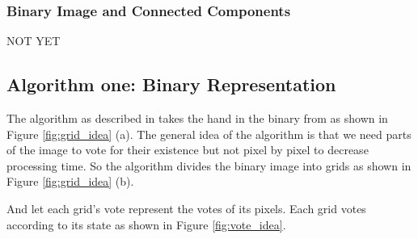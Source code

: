\subsubsection{Binary Image and Connected Components}
NOT YET

\subsection{Algorithm one: Binary Representation}

The algorithm as described in \cite{paper1sb} takes the hand in the binary from as shown in Figure \ref{fig:grid_idea} (a).
The general idea of the algorithm is that we need parts of the image to vote for their existence but not pixel by pixel to decrease processing time. So the algorithm divides the binary image into grids as shown in Figure \ref{fig:grid_idea} (b).
\begin{figure}[h]
\end{figure}
And let each grid's vote represent the votes of its pixels. Each grid votes according to its state as shown in Figure \ref{fig:vote_idea}.\bigskip
